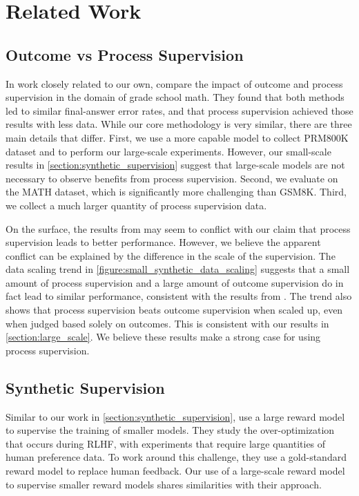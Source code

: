\section{Related Work}

\subsection{Outcome vs Process Supervision}

In work closely related to our own, \cite{uesato2022solving} compare the impact of outcome and process supervision in the domain of grade school math. They found that both methods led to similar final-answer error rates, and that process supervision achieved those results with less data. While our core methodology is very similar, there are three main details that differ. First, we use a more capable model to collect PRM800K dataset and to perform our large-scale experiments. However, our small-scale results in \ref{section:synthetic_supervision} suggest that large-scale models are not necessary to observe benefits from process supervision. Second, we evaluate on the MATH dataset, which is significantly more challenging than GSM8K. Third, we collect a much larger quantity of process supervision data.

On the surface, the results from \cite{uesato2022solving} may seem to conflict with our claim that process supervision leads to better performance. However, we believe the apparent conflict can be explained by the difference in the scale of the supervision. The data scaling trend in \ref{figure:small_synthetic_data_scaling} suggests that a small amount of process supervision and a large amount of outcome supervision do in fact lead to similar performance, consistent with the results from \cite{uesato2022solving}. The trend also shows that process supervision beats outcome supervision when scaled up, even when judged based solely on outcomes. This is consistent with our results in \ref{section:large_scale}. We believe these results make a strong case for using process supervision.

\subsection{Synthetic Supervision}

Similar to our work in \ref{section:synthetic_supervision}, \cite{gao2022scaling} use a large reward model to supervise the training of smaller models. They study the over-optimization that occurs during RLHF, with experiments that require large quantities of human preference data. To work around this challenge, they use a gold-standard reward model to replace human feedback. Our use of a large-scale reward model to supervise smaller reward models shares similarities with their approach.

